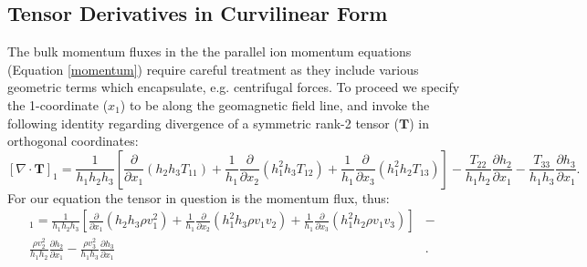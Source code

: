 \documentclass[11pt,letterpaper]{article}
\begin{document}
\subsection{Tensor Derivatives in Curvilinear Form}

The bulk momentum fluxes in the the parallel ion momentum equations (Equation \ref{momentum}) require careful treatment as they include various geometric terms which encapsulate, e.g. centrifugal forces.  To proceed we specify the 1-coordinate ($x_1$) to be along the geomagnetic field line, and invoke the following identity regarding divergence of a symmetric rank-2 tensor ($\mathbf{T}$) in orthogonal coordinates:
\begin{equation}
\left[ \nabla \cdot \mathbf{T} \right]_1 = \frac{1}{h_1 h_2 h_3} \left[ \frac{\partial}{\partial x_1}(h_2 h_3 T_{11}) + \frac{1}{h_1} \frac{\partial}{\partial x_2}(h_1^2 h_3 T_{12}) + \frac{1}{h_1} \frac{\partial}{\partial x_3}(h_1^2 h_2 T_{13}) \right] - \frac{T_{22}}{h_1 h_2} \frac{\partial h_2}{\partial x_1} - \frac{T_{33}}{h_1 h_3} \frac{\partial h_3}{\partial x_1}.  \label{divtens}
\end{equation}
For our equation the tensor in question is the momentum flux, thus:
\begin{eqnarray}
[\nabla \cdot (\rho \mathbf{v} \mathbf{v})]_1 = \frac{1}{h_1 h_2 h_3} \left[ \frac{\partial}{\partial x_1}(h_2 h_3 \rho v_1^2) + \frac{1}{h_1} \frac{\partial}{\partial x_2}(h_1^2 h_3 \rho v_1 v_2) + \frac{1}{h_1} \frac{\partial}{\partial x_3}(h_1^2 h_2 \rho v_1 v_3) \right] &-& \nonumber \\
\frac{\rho v_2^2}{h_1 h_2} \frac{\partial h_2}{\partial x_1} - \frac{\rho v_3^2}{h_1 h_3} \frac{\partial h_3}{\partial x_1} &.&
\end{eqnarray}
\end{document}
